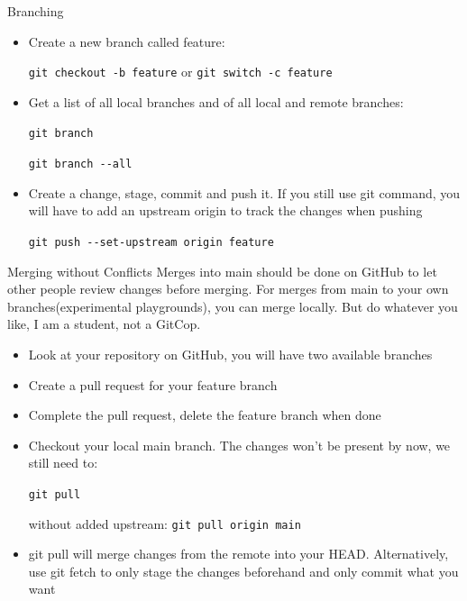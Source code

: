 \documentclass[en]{sdqbeamer}
\begin{document}
\begin{frame}{Branching}
\begin{itemize}
    \item Create a new branch called feature:

        \lstinline{git checkout -b feature} or \lstinline{git switch -c feature}

    \item Get a list of all local branches and of all local and remote branches:

        \lstinline{git branch}
        
        \lstinline{git branch --all}

    \item Create a change, stage, commit and push it. If you still use git command, you will have to add an upstream origin to track the changes when pushing

        \lstinline{git push --set-upstream origin feature}
\end{itemize}
\end{frame}

\begin{frame}{Merging without Conflicts}
Merges into main should be done on GitHub to let other people review changes before merging. For merges from main to your own branches(experimental playgrounds), you can merge locally. But do whatever you like, I am a student, not a GitCop.
\begin{itemize}
    \item Look at your repository on GitHub, you will have two available branches
    \item Create a pull request for your feature branch
    \item Complete the pull request, delete the feature branch when done
    \item Checkout your local main branch. The changes won't be present by now, we still need to:
    
        \lstinline{git pull}
        
        without added upstream: \lstinline{git pull origin main}
    \item git pull will merge changes from the remote into your HEAD. Alternatively, use git fetch to only stage the changes beforehand and only commit what you want
\end{itemize}    
\end{frame}
\end{document}
